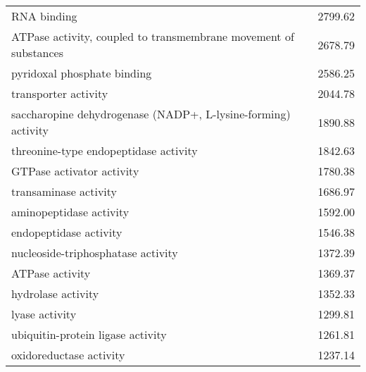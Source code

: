 \begin{table}[hp]
\begin{center}
\begin{tabular}{p{}r}
RNA binding                                                                                    & 2799.62                     \\
ATPase activity, coupled to transmembrane movement of substances                               & 2678.79                     \\
pyridoxal phosphate binding                                                                    & 2586.25                     \\
transporter activity                                                                           & 2044.78                     \\
saccharopine dehydrogenase (NADP+, L-lysine-forming) activity                                  & 1890.88                     \\
threonine-type endopeptidase activity                                                          & 1842.63                     \\
GTPase activator activity                                                                      & 1780.38                     \\
transaminase activity                                                                          & 1686.97                     \\
aminopeptidase activity                                                                        & 1592.00                     \\
endopeptidase activity                                                                         & 1546.38                     \\
nucleoside-triphosphatase activity                                                             & 1372.39                     \\
ATPase activity                                                                                & 1369.37                     \\
hydrolase activity                                                                             & 1352.33                     \\
lyase activity                                                                                 & 1299.81                     \\
ubiquitin-protein ligase activity                                                              & 1261.81                     \\
oxidoreductase activity                                                                        & 1237.14                     \\

\end{tabular}
\end{center}
\end{table}
